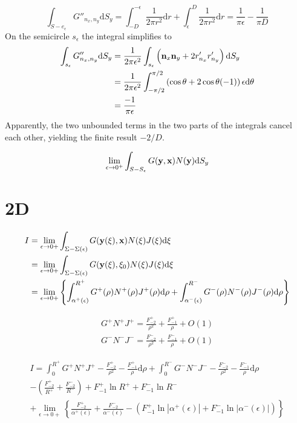 \documentclass[a4paper,11pt]{article}
\newcommand{\td}{\mathrm{d}}
\begin{document}
\begin{equation}
\int_{S-e_{\epsilon}} G''_{n_x,n_y} \td S_y
=
\int_{-D}^{-\epsilon} \frac{1}{2\pi r^2} \td r + \int_{\epsilon}^{D} \frac{1}{2\pi r^2} \td r
=
\frac{1}{\pi \epsilon} - \frac{1}{\pi D}
\end{equation}
%
On the semicircle $s_{\epsilon}$ the integral simplifies to
%
\begin{align}
\int_{s_{\epsilon}} G''_{n_x,n_y} \td S_y
&=
\frac{1}{2\pi\epsilon^2}\int_{s_{\epsilon}} \left({\bf n}_x{\bf n}_y + 2 r'_{n_x} r'_{n_y}\right) \td S_y \nonumber \\
&=
\frac{1}{2\pi \epsilon^2} \int_{-\pi/2}^{\pi/2} \left(\cos\theta + 2 \cos\theta (-1)\right) \epsilon \td \theta \nonumber \\
&= \frac{-1}{\pi\epsilon}
\end{align}
%
Apparently, the two unbounded terms in the two parts of the integrals cancel each other, yielding the finite result $-2/D$.


\begin{equation}
\lim_{\epsilon\to0^+}\int_{S-S_{\epsilon}} G({\bf y}, {\bf x}) N({\bf y}) \td S_y
\end{equation}

\section{2D}

\begin{align}
I &= \lim_{\epsilon \to 0+} \int_{\Sigma-\Sigma(\epsilon)} G({\bf y}(\xi), {\bf x}) N(\xi) J(\xi) \td \xi \nonumber \\
&= \lim_{\epsilon \to 0+} \int_{\Sigma-\Sigma(\epsilon)} G({\bf y}(\xi), \xi_0) N(\xi) J(\xi) \td \xi \nonumber \\
&= \lim_{\epsilon \to 0+} \left\{ \int_{\alpha^+(\epsilon)}^{R^+} G^+(\rho) N^+(\rho) J^+(\rho) \td \rho +
\int_{\alpha^-(\epsilon)}^{R^-} G^-(\rho) N^-(\rho) J^-(\rho) \td \rho
\right\}
\end{align}

\begin{align}
G^+ N^+ J^+ = \frac{F_{-2}^+}{\rho^2} + \frac{F_{-1}^+}{\rho} + O(1) \nonumber \\
G^- N^- J^- = \frac{F_{-2}^-}{\rho^2} + \frac{F_{-1}^-}{\rho} + O(1)
\end{align}

\begin{multline}
I =
\int_{0}^{R^+} G^+ N^+ J^+ - \frac{F_{-2}^+}{\rho^2} - \frac{F_{-1}^+}{\rho} \td \rho +
\int_{0}^{R^-} G^- N^- J^- - \frac{F_{-2}^-}{\rho^2} - \frac{F_{-1}^-}{\rho} \td \rho \\
-
\left(
\frac{F_{-2}^+}{R^+}
+ \frac{F_{-2}^-}{R^-} 
\right)
+ F_{-1}^+ \ln R^+
+ F_{-1}^- \ln R^- \\
+
\lim_{\epsilon \to 0+}
\left\{
\frac{F_{-2}^+}{\alpha^+(\epsilon)}
+ \frac{F_{-2}^-}{\alpha^-(\epsilon)}
- \left(F_{-1}^+ \ln \left|\alpha^+(\epsilon) \right|
+ F_{-1}^- \ln \left|\alpha^-(\epsilon) \right|\right)
\right\}
\end{multline}
\end{document}
